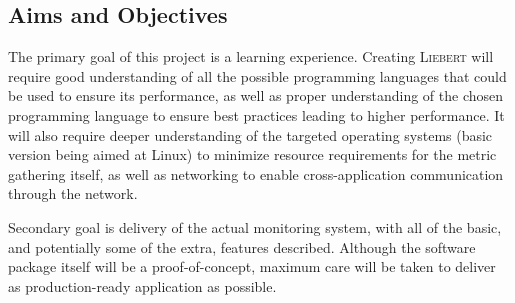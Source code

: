     \subsection{Aims and Objectives}
        The primary goal of this project is a learning experience. Creating \textsc{Liebert} will require good understanding of all the possible programming languages that could be used to ensure its performance, as well as proper understanding of the chosen programming language to ensure best practices leading to higher performance. It will also require deeper understanding of the targeted operating systems (basic version being aimed at Linux) to minimize resource requirements for the metric gathering itself, as well as networking to enable cross-application communication through the network.
            
        Secondary goal is delivery of the actual monitoring system, with all of the basic, and potentially some of the extra, features described. Although the software package itself will be a proof-of-concept, maximum care will be taken to deliver as production-ready application as possible.



